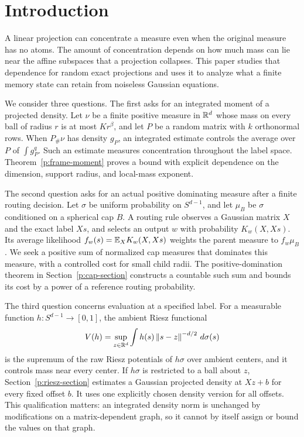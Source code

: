\section{Introduction}\label{p:introduction}

A linear projection can concentrate a measure even when the original
measure has no atoms. The amount of concentration depends on how much mass
can lie near the affine subspaces that a projection collapses. This paper
studies that dependence for random exact projections and uses it to analyze
what a finite memory state can retain from noiseless Gaussian equations.

We consider three questions. The first asks for an integrated moment of a
projected density. Let \(\nu\) be a finite positive measure in \(\mathbb R^d\)
whose mass on every ball of radius \(r\) is at most \(Kr^\beta\), and let
\(P\) be a random matrix with \(k\) orthonormal rows. When \(P_\#\nu\)
has density \(g_P\), an integrated estimate controls the average over
\(P\) of \(\int g_P^q\). Such an estimate measures concentration throughout
the label space. Theorem~\ref{p:frame-moment} proves a bound with explicit
dependence on the dimension, support radius, and local-mass exponent.

The second question asks for an actual positive dominating measure after a
finite routing decision. Let \(\sigma\) be uniform probability on
\(S^{d-1}\), and let \(\mu_B\) be \(\sigma\) conditioned on a spherical
cap \(B\). A routing rule observes a Gaussian matrix \(X\) and the exact
label \(Xs\), and selects an output \(w\) with probability
\(K_w(X,Xs)\). Its average likelihood \(f_w(s)=\mathbb E_XK_w(X,Xs)\)
weights the parent measure to \(f_w\mu_B\). We seek a positive sum of
normalized cap measures that dominates this measure, with a controlled
cost for small child radii. The positive-domination theorem in
Section~\ref{p:cap-section} constructs a countable such sum and bounds
its cost by a power of a reference routing probability.

The third question concerns evaluation at a specified label. For a
measurable function \(h:S^{d-1}\to[0,1]\), the ambient Riesz functional
\[
 V(h)=\sup_{z\in\mathbb R^d}\int h(s)\left\lVert s-z\right\rVert^{-d/2}\,d\sigma(s)
\]
is the supremum of the raw Riesz potentials of \(h\sigma\) over ambient
centers, and it controls mass near every center. If \(h\sigma\) is restricted
to a ball about \(z\), Section~\ref{p:riesz-section} estimates a Gaussian projected
density at \(Xz+b\) for every fixed offset \(b\). It uses one explicitly
chosen density version for all offsets. This qualification matters:
an integrated density norm is unchanged by modifications on a
matrix-dependent graph, so it cannot by itself assign or bound the values
on that graph.

